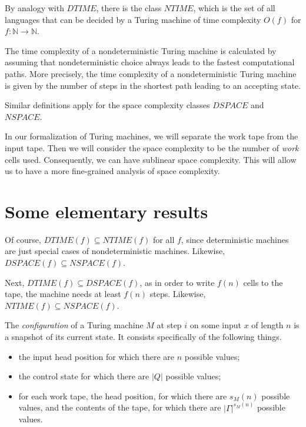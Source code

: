 \begin{definition}
    By analogy with $DTIME$, there is the class $NTIME$, which is the set of
    all languages that can be decided by a  Turing
    machine of time complexity $O(f)$ for $f : \mathbb{N} \to \mathbb{N}$.
\end{definition}

The time complexity of a nondeterministic Turing machine is calculated by
assuming that nondeterministic choice always leads to the fastest computational
paths. More precisely, the time complexity of a nondeterministic Turing machine
is given by the number of steps in the shortest path leading to an accepting
state.

Similar definitions apply for the space complexity classes $DSPACE$ and
$NSPACE$.

In our formalization of Turing machines, we will separate the work tape from
the input tape. Then we will consider the space complexity to be the number of
\emph{work} cells used. Consequently, we can have sublinear space complexity.
This will allow us to have a more fine-grained analysis of space complexity.

\section{Some elementary results}

Of course, $DTIME(f) \subseteq NTIME(f)$ for all $f$, since deterministic
machines are just special cases of nondeterministic machines. Likewise,
$DSPACE(f) \subseteq NSPACE(f)$.

Next, $DTIME(f) \subseteq DSPACE(f)$, as in order to write $f(n)$ cells to the
tape, the machine needs at least $f(n)$ steps. Likewise, $NTIME(f) \subseteq
NSPACE(f)$.

\begin{definition}
    The \emph{configuration} of a Turing machine $M$ at step $i$ on some input
    $x$ of length $n$ is a snapshot of its current state. It consists
    specifically of the following things.
    \begin{itemize}
        \item
            the input head position for which there are $n$ possible values;
        \item
            the control state for which there are $|Q|$ possible values;
        \item
            for each work tape, the head position, for which there are $s_M(n)$
            possible values, and the contents of the tape, for which there are
            $|\Gamma|^{s_M(n)}$ possible values.
    \end{itemize}
\end{definition}

